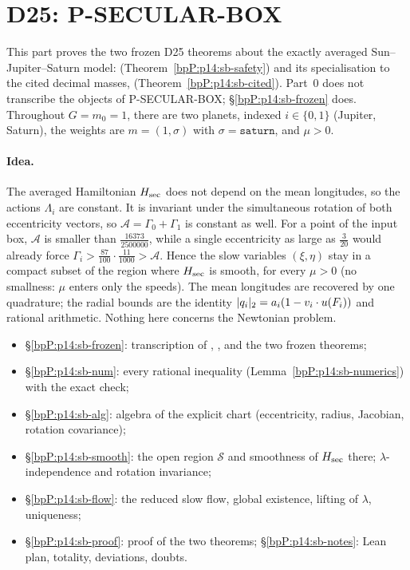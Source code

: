 \section{D25: P-SECULAR-BOX}\label{bpP:p14:sb}
\begingroup\sloppy

This part proves the two frozen D25 theorems about the exactly averaged Sun--Jupiter--Saturn model:
 (Theorem~\ref{bpP:p14:sb-safety}) and its specialisation to the cited decimal masses,
 (Theorem~\ref{bpP:p14:sb-cited}). Part~0 does not transcribe the objects of P-SECULAR-BOX; \S\ref{bpP:p14:sb-frozen} does.
Throughout $G=m_0=1$, there are two planets, indexed $i\in\{0,1\}$ (Jupiter, Saturn), the weights are $m=(1,\sigma)$ with $\sigma=\texttt{saturn}$, and $\mu>0$.

\paragraph{Idea.} The averaged Hamiltonian $H_{\rm sec}$ does not depend on the mean longitudes, so the actions $\Lambda_i$ are constant. It is invariant under the simultaneous rotation of both eccentricity vectors, so
$\mathcal A=\Gamma_0+\Gamma_1$ is constant as well. For a point of the input box, $\mathcal A$ is smaller than $\frac{16373}{2500000}$, while a single eccentricity as large as $\frac3{20}$ would already force
$\Gamma_i>\frac{87}{100}\cdot\frac{11}{1000}>\mathcal A$. Hence the slow variables $(\xi,\eta)$ stay in a compact subset of the region where $H_{\rm sec}$ is smooth, for every $\mu>0$ (no smallness: $\mu$ enters only the speeds).
The mean longitudes are recovered by one quadrature; the radial bounds are the identity $\lvert q_i\rvert_2=a_i(1-v_i\cdot u(F_i))$ and rational arithmetic. Nothing here concerns the Newtonian problem.

\begin{itemize}
\item \S\ref{bpP:p14:sb-frozen}: transcription of , , and the two frozen theorems;
\item \S\ref{bpP:p14:sb-num}: every rational inequality (Lemma~\ref{bpP:p14:sb-numerics}) with the exact check;
\item \S\ref{bpP:p14:sb-alg}: algebra of the explicit chart (eccentricity, radius, Jacobian, rotation covariance);
\item \S\ref{bpP:p14:sb-smooth}: the open region $\mathcal S$ and smoothness of $H_{\rm sec}$ there; $\lambda$-independence and rotation invariance;
\item \S\ref{bpP:p14:sb-flow}: the reduced slow flow, global existence, lifting of $\lambda$, uniqueness;
\item \S\ref{bpP:p14:sb-proof}: proof of the two theorems; \S\ref{bpP:p14:sb-notes}: Lean plan, totality, deviations, doubts.
\end{itemize}

